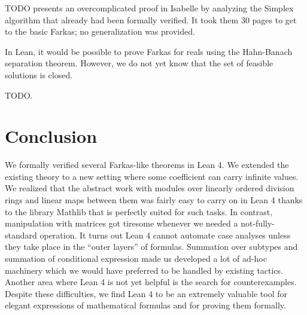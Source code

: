 \documentclass[]{article}
\renewcommand{\.}{\hskip .75pt}
\begin{document}
TODO presents an overcomplicated proof in Isabelle by analyzing
the Simplex algorithm that already had been formally verified.
It took them 30 pages to get to the basic Farkas; no generalization
was provided.

In Lean, it would be possible to prove Farkas for reals using the
Hahn-Banach separation theorem. However, we do not yet know that
the set of feasible solutions is closed.

TODO.


\section {Conclusion}

We formally verified several Farkas-like theorems in Lean 4.
We extended the existing theory to a new setting where some
coefficient can carry infinite values. We realized that the
abstract work with modules over linearly ordered division rings
and linear maps between them was fairly easy to carry on in
Lean 4 thanks to the library Mathlib that is perfectly suited
for such tasks. In contrast, manipulation with matrices got
tiresome whenever we needed a not-fully-standard operation.
It turns out Lean 4 cannot automate case analyses unless they
take place in the ``outer layers'' of formulas. Summation
over subtypes and summation of conditional expression made
us developed a lot of ad-hoc machinery which we would have
preferred to be handled by existing tactics. Another area
where Lean 4 is not yet helpful is the search for counterexamples.
Despite these difficulties, we find Lean 4 to be an extremely
valuable tool for elegant expressions of mathematical formulas
and for proving them formally.
\end{document}

